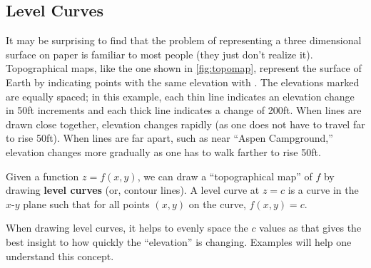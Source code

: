 \subsection*{Level Curves}

It may be surprising to find that the problem of representing a three dimensional surface on paper is familiar to most people (they just don't realize it). Topographical maps, like the one shown in \autoref{fig:topomap}, represent the surface of Earth by indicating points with the same elevation with . The elevations marked are equally spaced; in this example, each thin line indicates an elevation change in 50ft increments and each thick line indicates a change of 200ft. When lines are drawn close together, elevation changes rapidly (as one does not have to travel far to rise 50ft). When lines are far apart, such as near ``Aspen Campground,'' elevation changes more gradually as one has to walk farther to rise 50ft.


Given a function $z=f(x,y)$, we can draw a ``topographical map'' of $f$ by drawing \textbf{level curves} (or, contour lines). A level curve at $z=c$ is a curve in the $x$-$y$ plane such that for all points $(x,y)$ on the curve, $f(x,y) = c$. 

When drawing level curves, it helps to evenly space the $c$ values as that gives the best insight to how quickly the ``elevation'' is changing. Examples will help one understand this concept.

